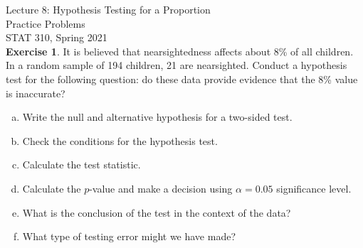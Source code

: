 \documentclass[11pt]{article}\usepackage[]{graphicx}\usepackage[]{color}
\begin{document}
\setlength\parindent{0pt}

Lecture 8: Hypothesis Testing for a Proportion\\
Practice Problems\\
STAT 310, Spring 2021\\

\textbf{Exercise 1}.  It is believed that nearsightedness affects about 8\% of all children.  In a random sample of 194 children, 21 are nearsighted.  Conduct a hypothesis test for the following question: do these data provide evidence that the 8\% value is inaccurate?
\begin{enumerate}[(a)]
\item Write the null and alternative hypothesis for a two-sided test.\\
\vspace{1.5cm}

\item Check the conditions for the hypothesis test.\\
\vspace{1.5cm}

\item Calculate the test statistic.\\
\vspace{2cm}

\item Calculate the $p$-value and make a decision using $\alpha = 0.05$ significance level.\\
\vspace{2.5cm}

\item What is the conclusion of the test in the context of the data?\\
\vspace{2cm}

\item What type of testing error might we have made?
\end{enumerate}

\newpage
\end{document}
